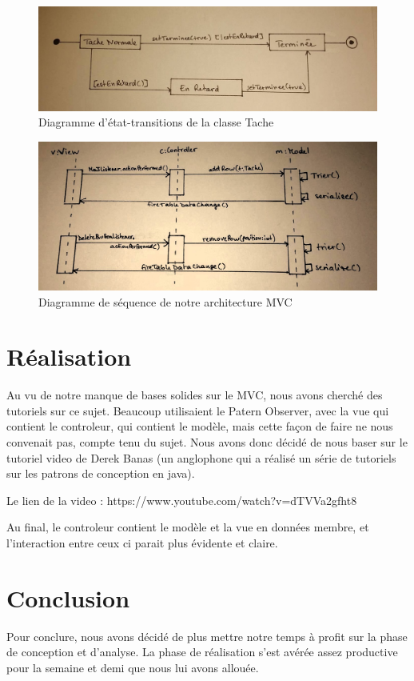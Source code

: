\documentclass[a4paper,10pt]{article}
\begin{document}
\begin{figure}
\centering
\includegraphics[scale=0.30]{etat.jpg}
\caption{Diagramme d'état-transitions de la classe Tache}\label{etat}
\end{figure}

\begin{figure}
\centering
\includegraphics[scale=0.30]{seq.jpg}
\caption{Diagramme de séquence de notre architecture MVC}\label{seq}
\end{figure}

\newpage
\section{Réalisation}
Au vu de notre manque de bases solides sur le MVC, nous avons cherché des tutoriels sur ce sujet. Beaucoup utilisaient le Patern Observer, avec la vue qui contient le controleur, qui contient le modèle, mais cette façon de faire ne nous convenait pas, compte tenu du sujet. Nous avons donc décidé de nous baser sur le tutoriel video de Derek Banas (un anglophone qui a réalisé un série de tutoriels sur les patrons de conception en java). 

Le lien de la video : https://www.youtube.com/watch?v=dTVVa2gfht8

Au final, le controleur contient le modèle et la vue en données membre, et l'interaction entre ceux ci parait plus évidente et claire.

\section{Conclusion}
Pour conclure, nous avons décidé de plus mettre notre temps à profit sur la phase de conception et d'analyse. La phase de réalisation s'est avérée assez productive pour la semaine et demi que nous lui avons allouée. 
\end{document}
